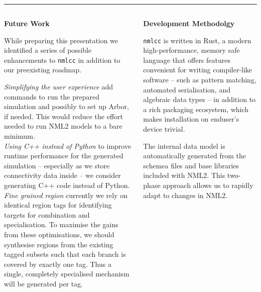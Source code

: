 \documentclass{beamer}
\begin{document}
\begin{frame}[t, fragile]
\begin{columns}
\begin{column}{0.15\textwidth}
\begin{figure}[h]
        \label{fig:5a}
      \end{figure}
    \end{column}
  \end{columns}
  \vspace*{1ex}
  \textcolor{arbred}{\rule{\textwidth}{0.5ex}}
  \vspace*{-1ex}
  \begin{columns}[t]
    \begin{column}[t]{0.49\textwidth}
      \textbf{Future Work}

      While preparing this presentation we identified a series of possible
      enhancements to \texttt{nmlcc} in addition to our preexisting roadmap.

      \emph{Simplifying the user experience} add commands to run the prepared
      simulation and possibly to set up Arbor, if needed. This would reduce the
      effort needed to run NML2 models to a bare minimum.\\[1.5ex]
      \emph{Using C++ instead of Python} to improve runtime performance for the
      generated simulation -- especially as we store connectivity data inside --
      we consider generating C++ code instead of Python.\\[1.5ex]
      \emph{Fine grained region} currently we rely on identical region tags for
      identifying targets for combination and specialisation. To maximise the
      gains from these optimisations, we should synthesise regions from the
      existing tagged subsets such that each branch is covered by exactly one
      tag. Thus a single, completely specialised mechanism will be generated per
      tag.
    \end{column}
    \begin{column}[t]{0.49\textwidth}
      \textbf{Development Methodolgy}

      \texttt{nmlcc} is written in Rust, a modern high-performance, memory safe
      language that offers features convenient for writing compiler-like
      software -- such as pattern matching, automated serialisation, and
      algebraic data types -- in addition to a rich packaging ecosystem, which
      makes installation on enduser's device trivial.

      The internal data model is automatically generated from the schemea files
      and base libraries included with NML2. This two-phase approach allows us
      to rapidly adapt to changes in NML2.


\end{column}
\end{columns}
\end{frame}
\end{document}
